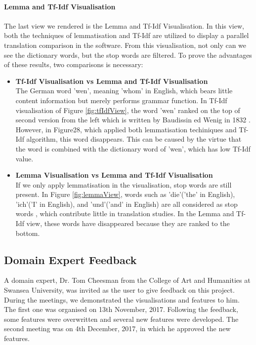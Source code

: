 \paragraph{Lemma and Tf-Idf Visualisation}
\paragraph[]{} The last view we rendered is the Lemma and Tf-Idf Visualisation. In this view, both the techniques of lemmatisation and Tf-Idf are utilized to display a parallel translation comparison in the software. From this visualisation, not only can we see the dictionary words, but the stop words are filtered. To prove the advantages of these results, two comparisons is necessary:
\begin{itemize} 	
	\item \textbf{Tf-Idf Visualisation vs Lemma and Tf-Idf Visualisation}\\
    The German word 'wen', meaning 'whom' in English, which bears little content information but merely performs grammar function. In Tf-Idf visualisation of Figure \ref{fig:tfIdfView}, the word 'wen' ranked on the top of second version from the left which is written by Baudissin ed Wenig in 1832 \cite{Hotho2005}. However, in Figure28, which applied both lemmatisation techiniques and Tf-Idf algorithm, this word disappears. This can be caused by the virtue that the word is combined with the dictionary word of 'wen', which has low Tf-Idf value.
	\item \textbf{Lemma Visualisation vs Lemma and Tf-Idf Visualisation}\\
If we only apply lemmatisation in the visualisation, stop words are still present. In Figure \ref{fig:lemmaView}, words such as 'die'('the' in English), 'ich'('I' in English), and 'und'('and' in English) are all considered as stop words \cite{Hotho2005}, which contribute little in translation studies. In the Lemma and Tf-Idf view, these words have disappeared because they are ranked to the bottom. 
\end{itemize}

\subsection{Domain Expert Feedback}

A domain expert, Dr. Tom Cheesman from the College of Art and Humanities at Swansea University, was invited as the user to give feedback on this project. During the meetings, we demonstrated the visualisations and features to him. The first one was organised on 13th November, 2017. Following the feedback, some features were overwritten and several new features were developed. The second meeting was on 4th December, 2017, in which he approved the new features.


